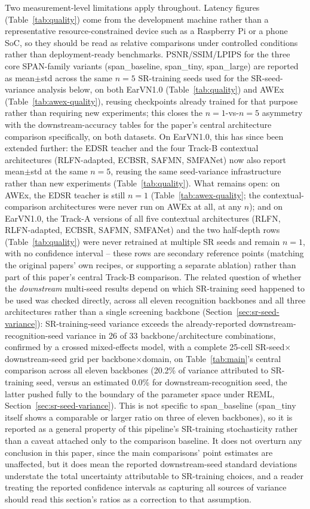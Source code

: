 \documentclass[11pt]{article}
\begin{document}
Two measurement-level limitations apply throughout. Latency figures (Table~\ref{tab:quality}) come from the development machine rather than a representative resource-constrained device such as a Raspberry Pi or a phone SoC, so they should be read as relative comparisons under controlled conditions rather than deployment-ready benchmarks. PSNR/SSIM/LPIPS for the three core SPAN-family variants (span\_baseline, span\_tiny, span\_large) are reported as mean$\pm$std across the same $n=5$ SR-training seeds used for the SR-seed-variance analysis below, on both EarVN1.0 (Table~\ref{tab:quality}) and AWEx (Table~\ref{tab:awex-quality}), reusing checkpoints already trained for that purpose rather than requiring new experiments; this closes the $n=1$-vs-$n=5$ asymmetry with the downstream-accuracy tables for the paper's central architecture comparison specifically, on both datasets. On EarVN1.0, this has since been extended further: the EDSR teacher and the four Track-B contextual architectures (RLFN-adapted, ECBSR, SAFMN, SMFANet) now also report mean$\pm$std at the same $n=5$, reusing the same seed-variance infrastructure rather than new experiments (Table~\ref{tab:quality}). What remains open: on AWEx, the EDSR teacher is still $n=1$ (Table~\ref{tab:awex-quality}; the contextual-comparison architectures were never run on AWEx at all, at any $n$); and on EarVN1.0, the Track-A versions of all five contextual architectures (RLFN, RLFN-adapted, ECBSR, SAFMN, SMFANet) and the two half-depth rows (Table~\ref{tab:quality}) were never retrained at multiple SR seeds and remain $n=1$, with no confidence interval -- these rows are secondary reference points (matching the original papers' own recipes, or supporting a separate ablation) rather than part of this paper's central Track-B comparison. The related question of whether the \emph{downstream} multi-seed results depend on which SR-training seed happened to be used was checked directly, across all eleven recognition backbones and all three architectures rather than a single screening backbone (Section~\ref{sec:sr-seed-variance}): SR-training-seed variance exceeds the already-reported downstream-recognition-seed variance in 26 of 33 backbone/architecture combinations, confirmed by a crossed mixed-effects model, with a complete 25-cell SR-seed$\times$downstream-seed grid per backbone$\times$domain, on Table~\ref{tab:main}'s central comparison across all eleven backbones (20.2\% of variance attributed to SR-training seed, versus an estimated 0.0\% for downstream-recognition seed, the latter pushed fully to the boundary of the parameter space under REML, Section~\ref{sec:sr-seed-variance}). This is not specific to span\_baseline (span\_tiny itself shows a comparable or larger ratio on three of eleven backbones), so it is reported as a general property of this pipeline's SR-training stochasticity rather than a caveat attached only to the comparison baseline. It does not overturn any conclusion in this paper, since the main comparisons' point estimates are unaffected, but it does mean the reported downstream-seed standard deviations understate the total uncertainty attributable to SR-training choices, and a reader treating the reported confidence intervals as capturing all sources of variance should read this section's ratios as a correction to that assumption.
\end{document}
